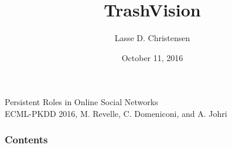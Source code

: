 \documentclass[10pt, hyperref={bookmarks=false}]{beamer}
\date{October 11, 2016}
\begin{document}

\title[Persistent Roles in
Online Social Networks]{TrashVision}
\author[\insertframenumber /\inserttotalframenumber]{Lasse D. Christensen}

\begin{frame}
\Large Persistent Roles in
Online Social Networks\\
\small ECML-PKDD 2016, M. Revelle, C. Domeniconi, and A. Johri\\
\end{frame}


\begin{frame}
  \frametitle{Contents}
  \tableofcontents
\end{frame}


%

%



\section*{}
\end{document}
